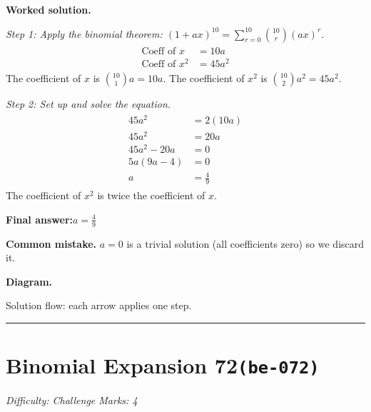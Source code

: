 \documentclass[11pt]{article}
\begin{document}
\textbf{Worked solution.}

\textit{Step 1: Apply the binomial theorem: \((1+ax)^{10} = \sum_{r=0}^{10} \binom{10}{r} (ax)^r\).}
\[\begin{gathered}
\begin{aligned} \text{Coeff of } x &= 10a \\ \text{Coeff of } x^2 &= 45a^2 \end{aligned}
\end{gathered}\]
The coefficient of \(x\) is \(\binom{10}{1}a = 10a\). The coefficient of \(x^2\) is \(\binom{10}{2}a^2 = 45a^2\).

\textit{Step 2: Set up and solve the equation.}
\[\begin{gathered}
\begin{aligned} 45a^2 &= 2(10a) \\ 45a^2 &= 20a \\ 45a^2 - 20a &= 0 \\ 5a(9a - 4) &= 0 \\ a &= \frac{4}{9} \end{aligned}
\end{gathered}\]
The coefficient of \(x^2\) is twice the coefficient of \(x\).

\begin{answerbox}
\textbf{Final answer:}\quad \(\displaystyle a = \frac{4}{9}\)
\end{answerbox}
\textbf{Common mistake.} \(a = 0\) is a trivial solution (all coefficients zero) so we discard it.

\textbf{Diagram.}

\begin{center}
\end{center}
\small Solution flow: each arrow applies one step.\normalsize

\medskip\hrule

\section*{Binomial Expansion 72\quad\small\texttt{(be-072)}}
\textit{Difficulty: Challenge \quad\textbar\quad Marks: 4}
\end{document}

